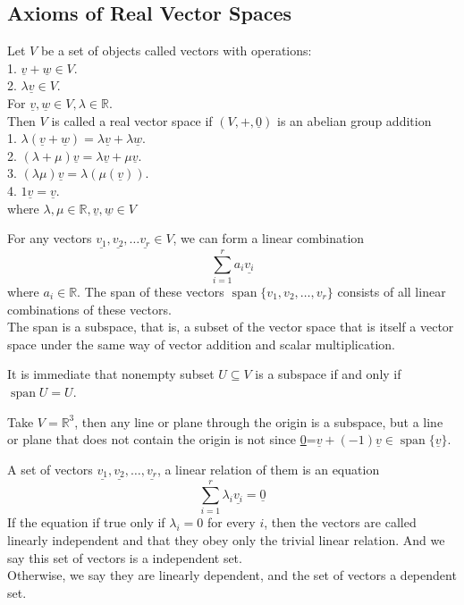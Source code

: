 \subsection{Axioms of Real Vector Spaces}
\begin{definition}
    Let $V$ be a set of objects called vectors with operations:\\
    1. $\underline{v}+\underline{w}\in V$.\\
    2. $\lambda\underline{v}\in V$.\\
    For $\underline{v},\underline{w}\in V, \lambda\in\mathbb R$.\\
    Then $V$ is called a real vector space if $(V,+,\underline{0})$ is an abelian group addition\\
    1. $\lambda (\underline{v}+\underline{w})=\lambda\underline{v}+\lambda\underline{w}$.\\
    2. $(\lambda+\mu)\underline{v}=\lambda\underline{v}+\mu\underline{v}$.\\
    3. $(\lambda\mu)\underline{v}=\lambda(\mu(\underline{v}))$.\\
    4. $1\underline{v}=\underline{v}$.\\
    where $\lambda,\mu\in\mathbb R, \underline{v},\underline{w}\in V$
\end{definition}
\begin{definition}
    For any vectors $\underline{v_1},\underline{v_2},\ldots\underline{v_r}\in V$, we can form a linear combination
    $$\sum_{i=1}^ra_i\underline{v_i}$$
    where $a_i\in\mathbb R$.
    The span of these vectors $\operatorname{span}\{v_1,v_2,\ldots,v_r\}$ consists of all linear combinations of these vectors.\\
    The span is a subspace, that is, a subset of the vector space that is itself a vector space under the same way of vector addition and scalar multiplication.
\end{definition}
It is immediate that nonempty subset $U\subseteq V$ is a subspace if and only if $\operatorname{span} U=U$.
\begin{example}
    Take $V=\mathbb R^3$, then any line or plane through the origin is a subspace, but a line or plane that does not contain the origin is not since \underline{0}=$\underline{v}+(-1)\underline{v}\in\operatorname{span}\{\underline{v}\}$.
\end{example}
\begin{definition}
    A set of vectors $\underline{v_1},\underline{v_2},\ldots,\underline{v_r}$, a linear relation of them is an equation
    $$\sum_{i=1}^r\lambda_i\underline{v_i}=\underline{0}$$
    If the equation if true only if $\lambda_i=0$ for every $i$, then the vectors are called linearly independent and that they obey only the trivial linear relation.
    And we say this set of vectors is a independent set.\\
    Otherwise, we say they are linearly dependent, and the set of vectors a dependent set.
\end{definition}
